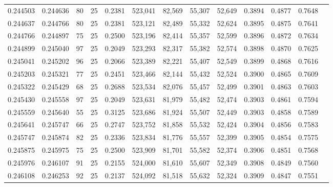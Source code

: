 \begin{tabular}{rrrrrrrrrrrrr}
0.244503 & 0.244636 &    80 &  25 &                                     0.2381 & 523,041 &  82,569 &  55,307 &  52,649 & 0.3894 & 0.4877 & 0.7648 \\
0.244637 & 0.244766 &    80 &  25 &                                     0.2381 & 523,121 &  82,489 &  55,332 &  52,624 & 0.3895 & 0.4875 & 0.7641 \\
0.244766 & 0.244897 &    75 &  25 &                                     0.2500 & 523,196 &  82,414 &  55,357 &  52,599 & 0.3896 & 0.4872 & 0.7634 \\
0.244899 & 0.245040 &    97 &  25 &                                     0.2049 & 523,293 &  82,317 &  55,382 &  52,574 & 0.3898 & 0.4870 & 0.7625 \\
0.245041 & 0.245202 &    96 &  25 &                                     0.2066 & 523,389 &  82,221 &  55,407 &  52,549 & 0.3899 & 0.4868 & 0.7616 \\
0.245203 & 0.245321 &    77 &  25 &                                     0.2451 & 523,466 &  82,144 &  55,432 &  52,524 & 0.3900 & 0.4865 & 0.7609 \\
0.245322 & 0.245429 &    68 &  25 &                                     0.2688 & 523,534 &  82,076 &  55,457 &  52,499 & 0.3901 & 0.4863 & 0.7603 \\
0.245430 & 0.245558 &    97 &  25 &                                     0.2049 & 523,631 &  81,979 &  55,482 &  52,474 & 0.3903 & 0.4861 & 0.7594 \\
0.245559 & 0.245640 &    55 &  25 &                                     0.3125 & 523,686 &  81,924 &  55,507 &  52,449 & 0.3903 & 0.4858 & 0.7589 \\
0.245641 & 0.245747 &    66 &  25 &                                     0.2747 & 523,752 &  81,858 &  55,532 &  52,424 & 0.3904 & 0.4856 & 0.7583 \\
0.245747 & 0.245874 &    82 &  25 &                                     0.2336 & 523,834 &  81,776 &  55,557 &  52,399 & 0.3905 & 0.4854 & 0.7575 \\
0.245875 & 0.245975 &    75 &  25 &                                     0.2500 & 523,909 &  81,701 &  55,582 &  52,374 & 0.3906 & 0.4851 & 0.7568 \\
0.245976 & 0.246107 &    91 &  25 &                                     0.2155 & 524,000 &  81,610 &  55,607 &  52,349 & 0.3908 & 0.4849 & 0.7560 \\
0.246108 & 0.246253 &    92 &  25 &                                     0.2137 & 524,092 &  81,518 &  55,632 &  52,324 & 0.3909 & 0.4847 & 0.7551 \\

\end{tabular}
